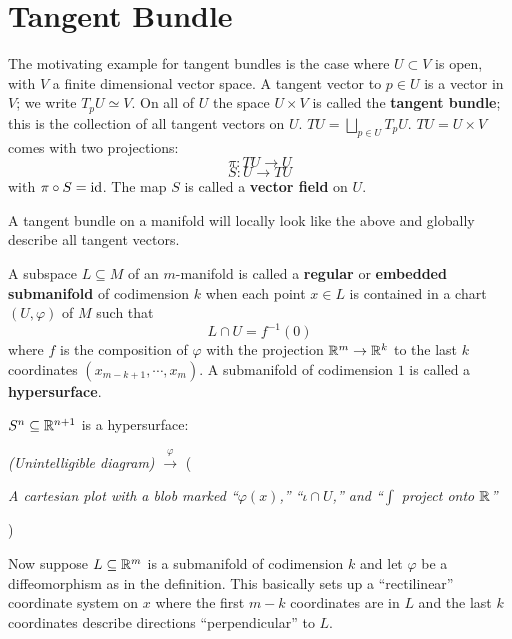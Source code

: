 \chapter{Tangent Bundle}
The motivating example for tangent bundles is the case where 
$U \subset V$ is open, with $V$ a finite dimensional vector space.
A tangent vector to $p \in U$ is a vector in $V$; we write
$T_p U \simeq V$. 
On all of $U$ the space $U \times V$ is called the 
\textbf{tangent bundle};
this is the collection of all tangent vectors on $U$. 
$TU=\bigsqcup_{p \in U} T_p U$.
$TU=U \times V$ comes with two projections:
\[ \pi : TU \to U \]
\[ S : U \to TU \]
with $\pi \circ S = \operatorname{id}$. The map $S$ is called a 
\textbf{vector field} on $U$.

\begin{idea}
A tangent bundle on a manifold will locally look like the above
and globally describe all tangent vectors.
\end{idea}

\begin{definition}
A subspace $L \subseteq M$ of an $m$-manifold is called a 
\textbf{regular} or \textbf{embedded submanifold} of 
codimension $k$ when each point $x \in L$ is contained in a chart
$(U,\varphi)$ of $M$ such that 
\[ L \cap U = f^{-1}(0) \]
where $f$ is the composition of $\varphi$ with the projection 
$\mathbb{R}^m \to \mathbb{R}^k$ to the last $k$ coordinates 
$(x_{m-k+1}, \cdots, x_m)$. A submanifold of codimension $1$ is
called a \textbf{hypersurface}.
\end{definition}

\begin{example}
$S^n \subseteq \mathbb{R}^{n+1}$ is a hypersurface:
\begin{center}
\textit{(Unintelligible diagram)} 
$\displaystyle{\overset{\varphi}{\longrightarrow}}$
\Big(\parbox{3in}{\textit{A cartesian plot with a blob marked 
``$\varphi(x)$,'' ``$\iota \cap U$,'' and ``$\int$ project onto $\mathbb{R}$''} }\Big)
\end{center}
\end{example}

Now suppose $L \subseteq \mathbb{R}^m$ is a submanifold of codimension $k$ and let 
$\varphi$ be a diffeomorphism as in the definition. This basically sets up a
``rectilinear'' coordinate system on $x$ where the first $m-k$ coordinates
are in $L$ and the last $k$ coordinates describe directions ``perpendicular''
to $L$. 

